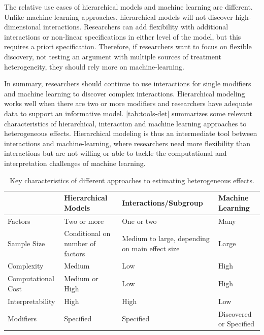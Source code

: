 \documentclass[12pt]{article}
\begin{document}
The relative use cases of hierarchical models and machine learning are different. 
Unlike machine learning approaches, hierarchical models will not discover high-dimensional interactions. 
Researchers can add flexibility with additional interactions or non-linear specifications in either level of the model, but this requires a priori specification. 
Therefore, if researchers want to focus on flexible discovery, not testing an argument with multiple sources of treatment heterogeneity, they should rely more on machine-learning. 


In summary, researchers should continue to use interactions for single modifiers and machine learning to discover complex interactions. 
Hierarchical modeling works well when there are two or more modifiers and researchers have adequate data to support an informative model.  
\autoref{tab:tools-det} summarizes some relevant characteristics of hierarchical, interaction and machine learning approaches to heterogeneous effects. 
Hierarchical modeling is thus an intermediate tool between interactions and machine-learning, where researchers need more flexibility than interactions but are not willing or able to tackle the computational and interpretation challenges of machine learning. 


\begin{table}
\begin{tabular}{|p{1in}|p{1.5in}|p{1.5in}|p{1.5in}|} \hline
                 & Hierarchical Models & Interactions/Subgroup & Machine Learning \\
\hline
Factors              & Two or more          & One or two         & Many \\ \hline
Sample Size          & Conditional on number of factors            & Medium to large, depending on main effect size    & Large \\ \hline
Complexity           & Medium             & Low                & High \\ \hline
Computational Cost   & Medium or High             & Low                & High \\ \hline
Interpretability     & High               & High               & Low \\ \hline
Modifiers            & Specified          & Specified      & Discovered or Specified \\
\hline
\end{tabular}
\caption{Key characteristics of different approaches to estimating heterogeneous effects.}
\label{tab:tools-det}
\end{table}
\end{document}

